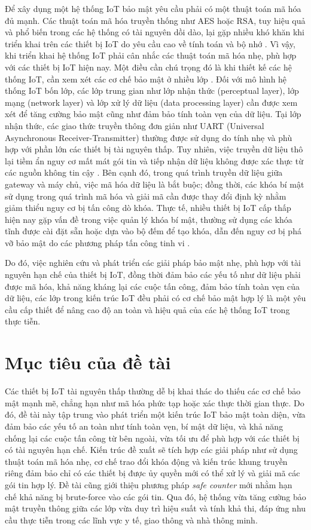 Để xây dụng một hệ thống IoT bảo mật yêu cầu phải có một thuật toán mã hóa đủ mạnh. Các thuật toán mã hóa truyền thống như AES hoặc RSA, tuy hiệu quả và phổ biến trong các hệ thống có tài nguyên dồi dào, lại gặp nhiều khó khăn khi triển khai trên các thiết bị IoT do yêu cầu cao về tính toán và bộ nhớ \cite{iot3}. Vì vậy, khi triển khai hệ thống IoT phải cân nhắc các thuật toán mã hóa nhẹ, phù hợp với các thiết bị IoT hiện nay. Một điều cần chú trọng đó là khi thiết kế các hệ thống IoT, cần xem xét các cơ chế bảo mật ở nhiều lớp \cite{iot4}. Đối với mô hình hệ thống IoT bốn lớp, các lớp trung gian như lớp nhận thức (perceptual layer), lớp mạng (network layer) và lớp xử lý dữ liệu (data processing layer) cần được xem xét để tăng cường bảo mật cũng như đảm bảo tính toàn vẹn của dữ liệu. Tại lớp nhận thức, các giao thức truyền thông đơn giản như UART (Universal Asynchronous Receiver-Transmitter) thường được sử dụng do tính nhẹ và phù hợp với phần lớn các thiết bị tài nguyên thấp. Tuy nhiên, việc truyền dữ liệu thô lại tiềm ẩn nguy cơ mất mát gói tin và tiếp nhận dữ liệu không được xác thực từ các nguồn không tin cậy \cite{iot5}. Bên cạnh đó, trong quá trình truyền dữ liệu giữa gateway và máy chủ, việc mã hóa dữ liệu là bắt buộc; đồng thời, các khóa bí mật sử dụng trong quá trình mã hóa và giải mã cần được thay đổi định kỳ nhằm giảm thiểu nguy cơ bị tấn công dò khóa. Thực tế, nhiều thiết bị IoT cấp thấp hiện nay gặp vấn đề trong việc quản lý khóa bí mật, thường sử dụng các khóa tĩnh được cài đặt sẵn hoặc dựa vào bộ đếm để tạo khóa, dẫn đến nguy cơ bị phá vỡ bảo mật do các phương pháp tấn công tinh vi \cite{iot6}.

Do đó, việc nghiên cứu và phát triển các giải pháp bảo mật nhẹ, phù hợp với tài nguyên hạn chế của thiết bị IoT, đồng thời đảm bảo các yếu tố như dữ liệu phải được mã hóa, khả năng kháng lại các cuộc tấn công, đảm bảo tính toàn vẹn của dữ liệu, các lớp trong kiến trúc IoT đều phải có cơ chế bảo mật hợp lý là một yêu cầu cấp thiết để nâng cao độ an toàn và hiệu quả của các hệ thống IoT trong thực tiễn.

\section{Mục tiêu của đề tài}
Các thiết bị IoT tài nguyên thấp thường dễ bị khai thác do thiếu các cơ chế bảo mật mạnh mẽ, chẳng hạn như mã hóa phức tạp hoặc xác thực thời gian thực. Do đó, đề tài này tập trung vào phát triển một kiến trúc IoT bảo mật toàn diện, vừa đảm bảo các yếu tố an toàn như tính toàn vẹn, bí mật dữ liệu, và khả năng chống lại các cuộc tấn công từ bên ngoài, vừa tối ưu để phù hợp với các thiết bị có tài nguyên hạn chế. Kiến trúc đề xuất sẽ tích hợp các giải pháp như sử dụng thuật toán mã hóa nhẹ, cơ chế trao đổi khóa động và kiến trúc khung truyền riêng đảm bảo chỉ có các thiết bị được ủy quyền mới có thể xử lý và giải mã các gói tin hợp lý. Đề tài cũng giới thiệu phương pháp \textit{safe counter} mới nhằm hạn chế khả năng bị brute-force vào các gói tin. Qua đó, hệ thống vừa tăng cường bảo mật truyền thông giữa các lớp vừa duy trì hiệu suất và tính khả thi, đáp ứng nhu cầu thực tiễn trong các lĩnh vực y tế, giao thông và nhà thông minh.


